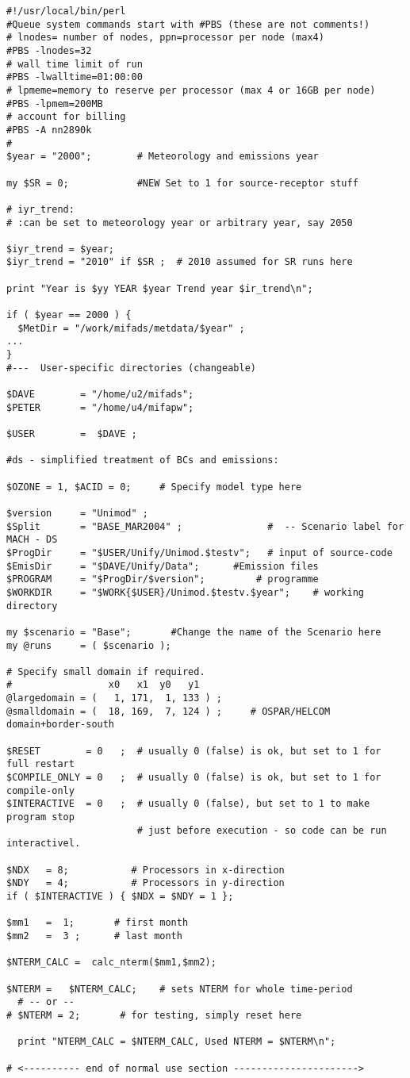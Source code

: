 \begin{verbatim}
#!/usr/local/bin/perl
#Queue system commands start with #PBS (these are not comments!)
# lnodes= number of nodes, ppn=processor per node (max4)
#PBS -lnodes=32
# wall time limit of run
#PBS -lwalltime=01:00:00
# lpmeme=memory to reserve per processor (max 4 or 16GB per node)
#PBS -lpmem=200MB
# account for billing
#PBS -A nn2890k
#
$year = "2000";        # Meteorology and emissions year

my $SR = 0;            #NEW Set to 1 for source-receptor stuff

# iyr_trend:
# :can be set to meteorology year or arbitrary year, say 2050

$iyr_trend = $year;  
$iyr_trend = "2010" if $SR ;  # 2010 assumed for SR runs here

print "Year is $yy YEAR $year Trend year $ir_trend\n";

if ( $year == 2000 ) {
  $MetDir = "/work/mifads/metdata/$year" ;
...
}
#---  User-specific directories (changeable)

$DAVE        = "/home/u2/mifads";      
$PETER       = "/home/u4/mifapw";      

$USER        =  $DAVE ;      

#ds - simplified treatment of BCs and emissions:

$OZONE = 1, $ACID = 0;     # Specify model type here

$version     = "Unimod" ;  
$Split       = "BASE_MAR2004" ;               #  -- Scenario label for MACH - DS
$ProgDir     = "$USER/Unify/Unimod.$testv";   # input of source-code
$EmisDir     = "$DAVE/Unify/Data";      #Emission files 
$PROGRAM     = "$ProgDir/$version";         # programme
$WORKDIR     = "$WORK{$USER}/Unimod.$testv.$year";    # working directory

my $scenario = "Base";       #Change the name of the Scenario here
my @runs     = ( $scenario );

# Specify small domain if required. 
#                 x0   x1  y0   y1
@largedomain = (   1, 171,  1, 133 ) ;
@smalldomain = (  18, 169,  7, 124 ) ;     # OSPAR/HELCOM domain+border-south

$RESET        = 0   ;  # usually 0 (false) is ok, but set to 1 for full restart
$COMPILE_ONLY = 0   ;  # usually 0 (false) is ok, but set to 1 for compile-only
$INTERACTIVE  = 0   ;  # usually 0 (false), but set to 1 to make program stop
                       # just before execution - so code can be run interactivel.

$NDX   = 8;           # Processors in x-direction
$NDY   = 4;           # Processors in y-direction
if ( $INTERACTIVE ) { $NDX = $NDY = 1 };

$mm1   =  1;       # first month
$mm2   =  3 ;      # last month

$NTERM_CALC =  calc_nterm($mm1,$mm2);

$NTERM =   $NTERM_CALC;    # sets NTERM for whole time-period
  # -- or --
# $NTERM = 2;       # for testing, simply reset here

  print "NTERM_CALC = $NTERM_CALC, Used NTERM = $NTERM\n";

# <---------- end of normal use section ---------------------->
\end{verbatim}


